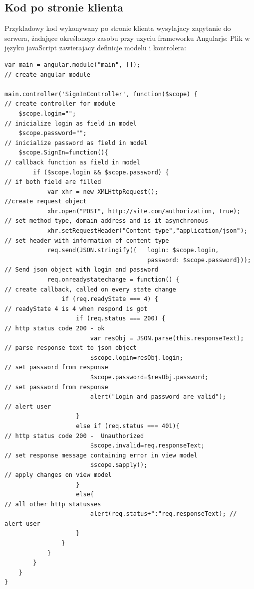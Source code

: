 \documentclass[12pt]{report}
\begin{document}
\subsection{Kod po stronie klienta}
Przykladowy kod wykonywany po stronie klienta wysylajacy zapytanie do serwera, żadające określonego zasobu przy uzyciu frameworku Angularjs:
Plik w języku javaScript zawierajacy definicje modelu i kontrolera:
\medskip
\begin{lstlisting}[caption=My Javascript Example]
var main = angular.module("main", []); 									// create angular module

main.controller('SignInController', function($scope) { 					// create controller for module
	$scope.login=""; 													// inicialize login as field in model
	$scope.password=""; 												// inicialize password as field in model
	$scope.SignIn=function(){ 											// callback function as field in model
		if ($scope.login && $scope.password) {							// if both field are filled
			var xhr = new XMLHttpRequest();									//create request object
			xhr.open("POST", http://site.com/authorization, true);		// set method type, domain address and is it asynchronous
			xhr.setRequestHeader("Content-type","application/json");	// set header with information of content type
			req.send(JSON.stringify({	login: $scope.login,			
										password: $scope.password})); 	// Send json object with login and password
			req.onreadystatechange = function() { 						// create callback, called on every state change
				if (req.readyState === 4) { 							// readyState 4 is 4 when respond is got
					if (req.status === 200) { 							// http status code 200 - ok
						var resObj = JSON.parse(this.responseText);		// parse response text to json object
						$scope.login=resObj.login;						// set password from response
						$scope.password=$resObj.password;				// set password from response
						alert("Login and password are valid");			// alert user
					}
					else if (req.status === 401){						// http status code 200 -  Unauthorized
						$scope.invalid=req.responseText;  				// set response message containing error in view model
						$scope.$apply(); 								// apply changes on view model
					}
					else{ 												// all other http statusses
						alert(req.status+":"req.responseText); // alert user
					}
				}
			}
		}
	}
}
\end{lstlisting}
\end{document}
